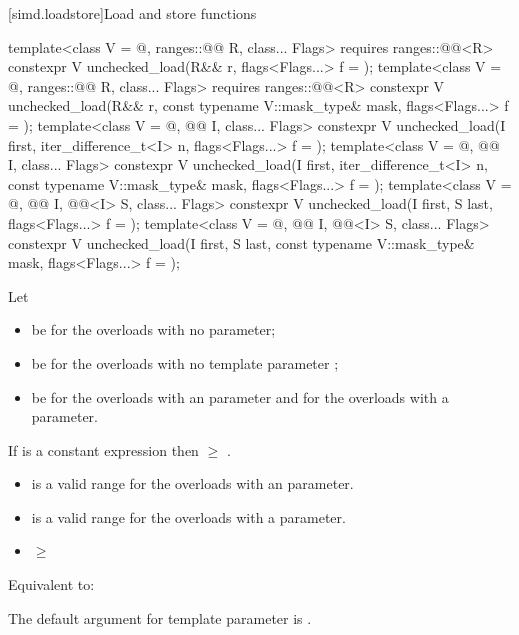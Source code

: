 [simd.loadstore]{Load and store functions}

\begin{itemdecl}
template<class V = @\seebelow@, ranges::@@ R, class... Flags>
  requires ranges::@@<R>
  constexpr V unchecked_load(R&& r, flags<Flags...> f = {});
template<class V = @\seebelow@, ranges::@@ R, class... Flags>
  requires ranges::@@<R>
  constexpr V unchecked_load(R&& r, const typename V::mask_type& mask, flags<Flags...> f = {});
template<class V = @\seebelow@, @@ I, class... Flags>
  constexpr V unchecked_load(I first, iter_difference_t<I> n, flags<Flags...> f = {});
template<class V = @\seebelow@, @@ I, class... Flags>
  constexpr V unchecked_load(I first, iter_difference_t<I> n, const typename V::mask_type& mask,
                             flags<Flags...> f = {});
template<class V = @\seebelow@, @@ I, @@<I> S, class... Flags>
  constexpr V unchecked_load(I first, S last, flags<Flags...> f = {});
template<class V = @\seebelow@, @@ I, @@<I> S, class... Flags>
  constexpr V unchecked_load(I first, S last, const typename V::mask_type& mask,
                             flags<Flags...> f = {});
\end{itemdecl}

\begin{itemdescr}
\pnum
Let
\begin{itemize}
 \item
    be  for the overloads with no
    parameter;
 \item
    be  for the overloads with no
   template parameter ;
 \item
    be  for the overloads with an 
   parameter and  for the overloads with a 
   parameter.
\end{itemize}

\pnum
\mandates
If  is a constant expression then
 $\ge$ .

\pnum
\expects
\begin{itemize}
\item {} is a valid range for the overloads with an
   parameter.
\item {} is a valid range for the overloads with a
   parameter.
\item {} $\ge$ 
\end{itemize}

\pnum
\effects
Equivalent to: 

\pnum
\remarks
The default argument for template parameter  is
.
\end{itemdescr}

